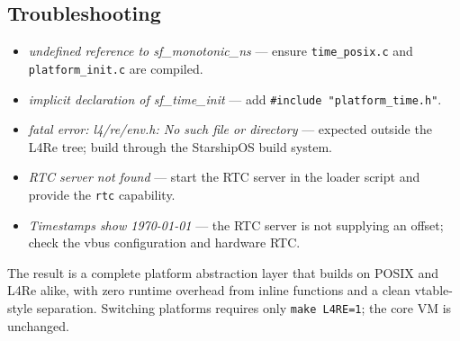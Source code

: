 \subsection{Troubleshooting}

\begin{itemize}
  \item \emph{undefined reference to sf\_monotonic\_ns} --- ensure
    \texttt{time\_posix.c} and \texttt{platform\_init.c} are compiled.
  \item \emph{implicit declaration of sf\_time\_init} --- add
    \texttt{\#include "platform\_time.h"}.
  \item \emph{fatal error: l4/re/env.h: No such file or directory} ---
    expected outside the L4Re tree; build through the StarshipOS build system.
  \item \emph{RTC server not found} --- start the RTC server in the loader
    script and provide the \texttt{rtc} capability.
  \item \emph{Timestamps show 1970-01-01} --- the RTC server is not supplying
    an offset; check the vbus configuration and hardware RTC.
\end{itemize}

The result is a complete platform abstraction layer that builds on POSIX and
L4Re alike, with zero runtime overhead from inline functions and a clean
vtable-style separation. Switching platforms requires only \texttt{make
L4RE=1}; the core VM is unchanged.
